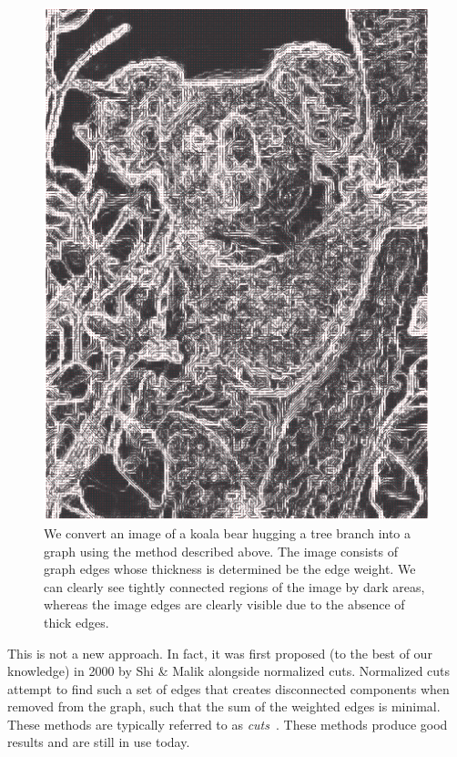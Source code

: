 \documentclass[conference]{IEEEtran}
\begin{document}
\begin{figure}[ht]
    \centering
    \includegraphics[width=\linewidth]{images/koala_graph.png}
    \caption{We convert an image of a koala bear hugging a tree branch into a graph using the method described above. The image consists of graph edges whose thickness is determined be the edge weight. We can clearly see tightly connected regions of the image by dark areas, whereas the image edges are clearly visible due to the absence of thick edges.}
    \label{fig:koala_graph}
\end{figure}

This is not a new approach. In fact, it was first proposed (to the best of our knowledge) in 2000 by Shi \& Malik alongside normalized cuts. Normalized cuts attempt to find such a set of edges that creates disconnected components when removed from the graph, such that the sum of the weighted edges is minimal. These methods are typically referred to as \textit{cuts}~\cite{shi2000normalized}. These methods produce good results and are still in use today.
\end{document}
